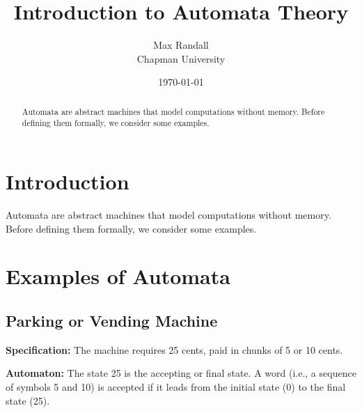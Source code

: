 \documentclass{article}
\title{Introduction to Automata Theory}
\author{Max Randall \\ Chapman University}
\date{\today}
\begin{document}
\maketitle

\begin{abstract}
Automata are abstract machines that model computations without memory. Before defining them formally, we consider some examples.
\end{abstract}

\tableofcontents

\section{Introduction}
Automata are abstract machines that model computations without memory. Before defining them formally, we consider some examples.

\newpage

\section{Examples of Automata}

\subsection{Parking or Vending Machine}
\textbf{Specification:} The machine requires 25 cents, paid in chunks of 5 or 10 cents.

\textbf{Automaton:} The state 25 is the accepting or final state. A word (i.e., a sequence of symbols 5 and 10) is accepted if it leads from the initial state (0) to the final state (25).

\begin{center}
\end{center}
\end{document}
